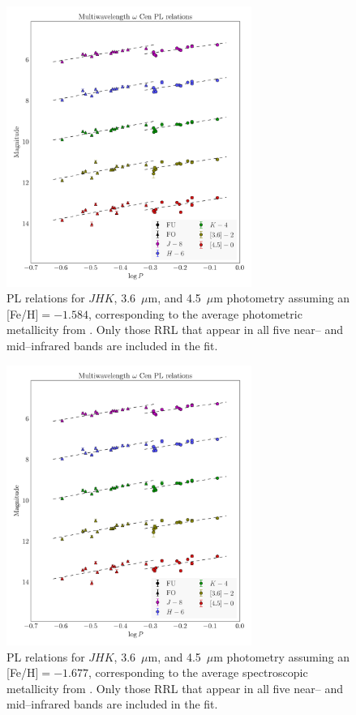 \documentclass[a4paper,fleqn,usenatbib]{mnras}
\begin{document}
\begin{figure}
\begin{center}
\includegraphics[width=80mm]{final_plots/multiwavelength_PL_samestars_phot_unweighted.pdf}
\caption{PL relations for $J\!H\!K$, 3.6~$\mu$m, and 4.5~$\mu$m photometry assuming an [Fe/H]$=-1.584$, corresponding to the average photometric metallicity from \citet{2000AJ....119.1824R}. Only those RRL that appear in all five near-- and mid--infrared bands are included in the fit.}
\label{fig:omegaCen_pl_phot}
\end{center}
\end{figure}

\begin{figure}
\begin{center}
\includegraphics[width=80mm]{final_plots/multiwavelength_PL_samestars_spect_unweighted.pdf}
\caption{PL relations for $J\!H\!K$, 3.6~$\mu$m, and 4.5~$\mu$m photometry assuming an [Fe/H]$=-1.677$, corresponding to the average spectroscopic metallicity from \citet{2006ApJ...640L..43S}.  Only those RRL that appear in all five near-- and mid--infrared bands are included in the fit.}
\label{fig:omegaCen_pl_spect}
\end{center}
\end{figure}
\end{document}
